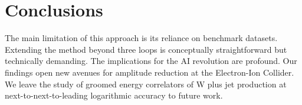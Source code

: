\section{Conclusions}\label{sec:conclusions}

The main limitation of this approach is its reliance on benchmark
datasets. Extending the method beyond three loops is conceptually
straightforward but technically demanding. The implications for the AI
revolution are profound. Our findings open new avenues for amplitude
reduction at the Electron-Ion Collider. We leave the study of groomed
energy correlators of W plus jet production at next-to-next-to-leading
logarithmic accuracy to future work.

